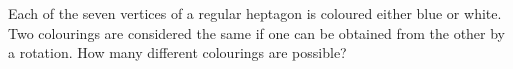 Each of the seven vertices of a regular heptagon is coloured either blue or white. Two colourings are considered the same if one can be obtained from the other by a rotation. How many different colourings are possible?
